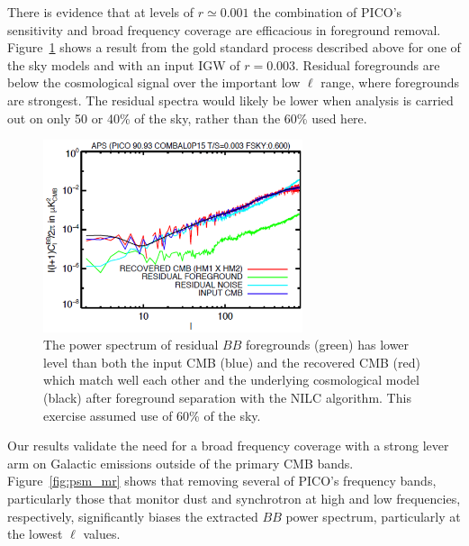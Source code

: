 \documentclass[PICOReport.tex]{subfiles}
\begin{document}
There is evidence that at levels of $r \simeq 0.001$ the combination of PICO's sensitivity and broad frequency coverage are efficacious in foreground removal. Figure~\ref{fig:nilc} shows a result from the gold standard process described above for one of the sky models and with an input \ac{IGW} of $r=0.003$. Residual foregrounds are below the cosmological signal over the important low $\ell$ range, where foregrounds are strongest. The residual spectra would likely be lower when analysis is carried out on only 50 or 40\% of the sky, rather than the 60\% used here. 

\begin{figure}
\hspace{-0.1in}
\parbox{3.0in}{\centerline {
\includegraphics[width=3.0in]{images/soumen_NILC_foregrounds_93.png}}}
\hspace{0.25in}
\parbox{3.0in}{
\caption{The power spectrum of residual $BB$ foregrounds (green) has lower level than both the input CMB (blue) and the recovered CMB (red) which match well each other and the underlying cosmological model (black) after foreground separation with the NILC algorithm. This exercise assumed use of 60\% of the sky.   
\label{fig:nilc}}}
\vspace{-0.1in}
\end{figure}

Our results validate the need for a broad frequency coverage with a strong lever arm on Galactic emissions outside of the primary CMB bands. Figure~\ref{fig:psm_mr} shows that removing several of PICO's frequency bands, particularly those that monitor dust and synchrotron at high and low frequencies, respectively, significantly biases the extracted $BB$ power spectrum, particularly at the lowest $\ell$ values. 
\end{document}
